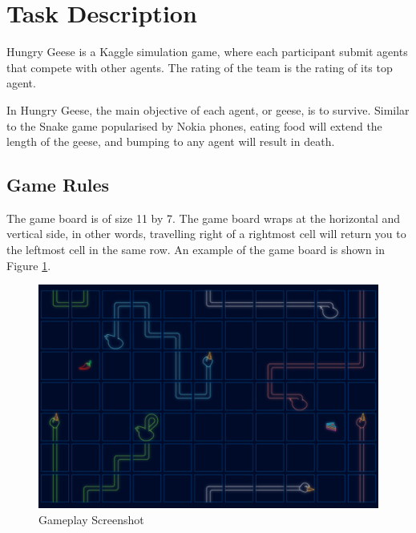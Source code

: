\section{Task Description}
\label{section_task}

Hungry Geese is a Kaggle simulation game, where each participant submit agents that compete with other agents. The rating of the team is the rating of its top agent.

In Hungry Geese, the main objective of each agent, or geese, is to survive. Similar to the Snake game popularised by Nokia phones, eating food will extend the length of the geese, and bumping to any agent will result in death.


\subsection{Game Rules}
\label{subsection_game_rules}


The game board is of size 11 by 7. The game board wraps at the horizontal and vertical side, in other words, travelling right of a rightmost cell will return you to the leftmost cell in the same row. An example of the game board is shown in Figure \ref{figure_gameplay}.

\begin{figure}[H]
\centering
\includegraphics[width=\textwidth]{images/gameplay.png}
\caption{Gameplay Screenshot}
\label{figure_gameplay}
\end{figure}

